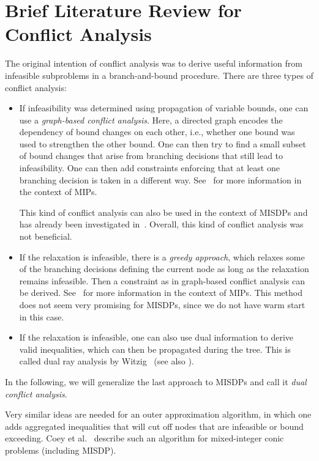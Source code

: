 \documentclass[10pt, a4paper]{article}
\begin{document}
\section{Brief Literature Review for Conflict Analysis}

The original intention of conflict analysis was to derive useful
information from infeasible subproblems in a branch-and-bound
procedure. There are three types of conflict analysis:
\begin{itemize}
\item If infeasibility was determined using propagation of variable bounds,
  one can use a \emph{graph-based conflict analysis}. Here, a directed graph
  encodes the dependency of bound changes on each other, i.e., whether one
  bound was used to strengthen the other bound. One can then try to find a
  small subset of bound changes that arise from branching decisions that
  still lead to infeasibility. One can then add constraints enforcing
  that at least one branching decision is taken in a different
  way. See~\cite{Ach07b,Ach07} for more information in the context of MIPs.

  This kind of conflict analysis can also be used in the context of MISDPs
  and has already been investigated in~\cite{MatP22}. Overall, this kind of
  conflict analysis was not beneficial.
\item If the relaxation is infeasible, there is a \emph{greedy approach},
  which relaxes some of the branching decisions defining the current node
  as long as the relaxation remains infeasible. Then a constraint as in
  graph-based conflict analysis can be derived. See~\cite{Ach07b,Ach07} for
  more information in the context of MIPs. This method does not seem very
  promising for MISDPs, since we do not have warm start in this case.
\item If the relaxation is infeasible, one can also use dual information
  to derive valid inequalities, which can then be propagated during the
  tree. This is called dual ray analysis by Witzig~\cite{Wit22} (see also
  \cite{WitBH17}).
\end{itemize}

In the following, we will generalize the last approach to MISDPs and call
it \emph{dual conflict analysis}.

Very similar ideas are needed for an outer approximation algorithm, in
which one adds aggregated inequalities that will cut off nodes that are
infeasible or bound exceeding. Coey et al.~\cite{CoeLV20} describe such an
algorithm for mixed-integer conic problems (including MISDP).
\end{document}
